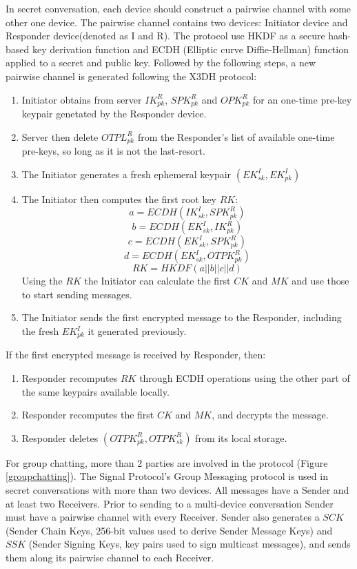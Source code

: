\documentclass[11pt,en]{elegantpaper}
\begin{document}
In secret conversation, each device should construct a pairwise channel with some other one device. The pairwise channel contains two devices: Initiator device and Responder device(denoted as I and R). The protocol use HKDF as a secure hash-based key derivation function and ECDH (Elliptic curve Diffie-Hellman) function applied to a secret and public key. Followed by the following steps, a new pairwise channel is generated following the X3DH protocol:
\begin{enumerate}
    \item Initiator obtains from server $IK_{pk}^R$, $SPK_{pk}^R$ and $OPK_{pk}^R$ for an one-time pre-key keypair genetated by the Responder device.
    \item Server then delete $OTPL^R_{pk}$ from the Responder's list of available one-time pre-keys, so long as it is not the last-resort.
    \item The Initiator generates a fresh ephemeral keypair $(EK^I_{sk},EK^I_{pk})$
    \item The Initiator then computes the first root key $RK$:
          $$a=ECDH(IK^I_{sk},SPK^R_{pk})$$
          $$b=ECDH(EK^I_{sk},IK^R_{pk})$$
          $$c=ECDH(EK^I_{sk},SPK^R_{pk})$$
          $$d=ECDH(EK^I_{sk},OTPK^R_{pk})$$
          $$RK=HKDF(a||b||c||d)$$
          Using the $RK$ the Initiator can calculate the first $CK$ and $MK$ and use those to start sending messages.
    \item The Initiator sends the first encrypted message to the Responder, including the fresh $EK_{pk}^I$ it generated previously.
\end{enumerate}

If the first encrypted message is received by Responder, then:
\begin{enumerate}
    \item Responder recomputes $RK$ through ECDH operations using the other part of the same keypairs available locally.
    \item Responder recomputes the first $CK$ and $MK$, and decrypts the message.
    \item Responder deletes $(OTPK_{pk}^R,OTPK_{sk}^R)$ from its local storage.

\end{enumerate}

For group chatting, more than 2 parties are involved in the protocol (Figure \ref{groupchatting}). The Signal Protocol’s Group Messaging protocol is used in secret conversations with more than two devices. All messages have a Sender and at least two Receivers. Prior to sending to a multi-device conversation Sender must have a pairwise channel with every Receiver. Sender also generates a $SCK$ (Sender Chain Keys, 256-bit values used to derive Sender Message Keys) and $SSK$ (Sender Signing Keys, key pairs used to sign multicast messages), and sends them along its pairwise channel to each Receiver.
\end{document}
